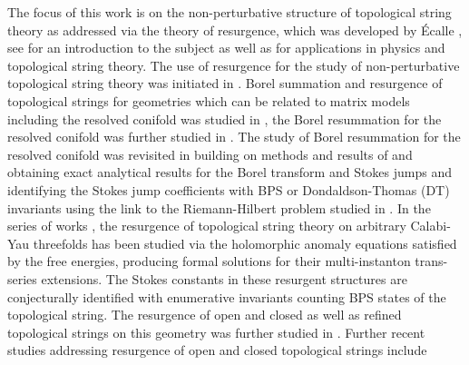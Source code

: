 \documentclass[a4paper,12pt,justification=centering]{article}
\numberwithin{equation}{section}
\theoremstyle{plain}%
\theoremstyle{definition}
\begin{document}
The focus of this work is on the non-perturbative structure of topological string theory as addressed via the theory of resurgence, which was developed by \'Ecalle \cite{ecalle1981resurgent},  see \cite{SauzinLectures} for an introduction to the subject as well as \cite{Marino:2012zq,Marino:2024tbx} for applications in physics and topological string theory. The use of resurgence for the study of non-perturbative topological string theory was initiated in \cite{Marino:2008ya}. Borel summation and resurgence of topological strings for geometries which can be related to matrix models including the resolved conifold was studied in \cite{Pasquetti:2009jg}, the Borel resummation for the resolved conifold was further studied in \cite{Hatsuda:2015owa}. The study of Borel resummation for the resolved conifold was revisited in \cite{Alim:2021mhp} building on methods and results of \cite{Coman:2018uwk,Coman:2020qgf,Alim:2020tpw,Alim:2021ukq,Garoufalidis:2020pax}  and obtaining exact analytical results for the Borel transform and Stokes jumps and identifying the Stokes jump coefficients with BPS or Dondaldson-Thomas (DT) invariants using the link to the Riemann-Hilbert problem studied in \cite{Bridgeland1,BridgelandCon}. In the series of works \cite{Gu:2022sqc,Iwaki:2023cek,Gu:2023mgf}, the resurgence of topological string theory on arbitrary Calabi-Yau threefolds has been studied via the holomorphic anomaly equations satisfied by the free energies, producing formal solutions for their multi-instanton trans-series extensions. The Stokes constants in these resurgent structures are conjecturally identified with enumerative invariants counting BPS states of the topological string. The resurgence of open and closed as well as refined topological strings on this geometry was further studied in \cite{Grassi:2022zuk,Alim:2022oll}.  Further recent studies addressing resurgence of open and closed topological strings include \cite{Rella:2022bwn,Marino:2023nem,Alexandrov:2023wdj,Fantini:2024snx}
\end{document}
